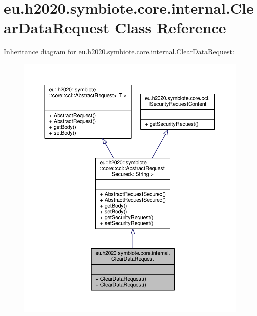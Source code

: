 \hypertarget{classeu_1_1h2020_1_1symbiote_1_1core_1_1internal_1_1ClearDataRequest}{}\section{eu.\+h2020.\+symbiote.\+core.\+internal.\+Clear\+Data\+Request Class Reference}
\label{classeu_1_1h2020_1_1symbiote_1_1core_1_1internal_1_1ClearDataRequest}


Inheritance diagram for eu.\+h2020.\+symbiote.\+core.\+internal.\+Clear\+Data\+Request\+:\nopagebreak
\begin{figure}[H]
\begin{center}
\leavevmode
\includegraphics[width=350pt]{classeu_1_1h2020_1_1symbiote_1_1core_1_1internal_1_1ClearDataRequest__inherit__graph}
\end{center}
\end{figure}


